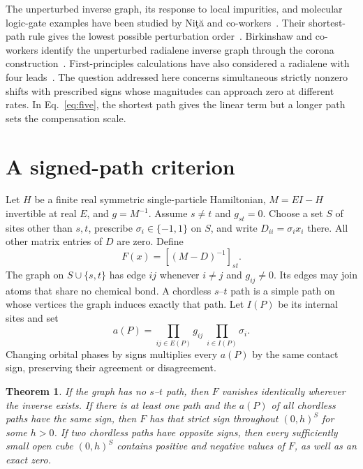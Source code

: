 \documentclass[11pt,a4paper]{article}
\newtheorem{theorem}{Theorem}
\begin{document}
The unperturbed inverse graph, its response to local impurities, and molecular logic-gate examples have been studied by Ni\c{t}\u{a} and co-workers~\cite{nita22,nita23}. Their shortest-path rule gives the lowest possible perturbation order~\cite[Secs.~3--4]{nita25}. Birkinshaw and co-workers identify the unperturbed radialene inverse graph through the corona construction~\cite[Sec.~5.1]{birkinshaw}. First-principles calculations have also considered a radialene with four leads~\cite{saha}. The question addressed here concerns simultaneous strictly nonzero shifts with prescribed signs whose magnitudes can approach zero at different rates. In Eq.~\eqref{eq:five}, the shortest path gives the linear term but a longer path sets the compensation scale.

\section{A signed-path criterion}
Let $H$ be a finite real symmetric single-particle Hamiltonian, $M=EI-H$ invertible at real $E$, and $g=M^{-1}$. Assume $s\ne t$ and $g_{st}=0$. Choose a set $S$ of sites other than $s,t$, prescribe $\sigma_i\in\{-1,1\}$ on $S$, and write $D_{ii}=\sigma_i x_i$ there. All other matrix entries of $D$ are zero. Define
\[
 F(x)=[(M-D)^{-1}]_{st}.
\]
The graph on $S\cup\{s,t\}$ has edge $ij$ whenever $i\ne j$ and $g_{ij}\ne0$. Its edges may join atoms that share no chemical bond. A chordless $s$--$t$ path is a simple path on whose vertices the graph induces exactly that path. Let $I(P)$ be its internal sites and set
\[
 a(P)=\prod_{ij\in E(P)} g_{ij}\ \prod_{i\in I(P)}\sigma_i .
\]
Changing orbital phases by signs multiplies every $a(P)$ by the same contact sign, preserving their agreement or disagreement.

\begin{theorem}\label{thm:sign}
If the graph has no $s$--$t$ path, then $F$ vanishes identically wherever the inverse exists. If there is at least one path and the $a(P)$ of all chordless paths have the same sign, then $F$ has that strict sign throughout $(0,h)^S$ for some $h>0$. If two chordless paths have opposite signs, then every sufficiently small open cube $(0,h)^S$ contains positive and negative values of $F$, as well as an exact zero.
\end{theorem}
\end{document}
